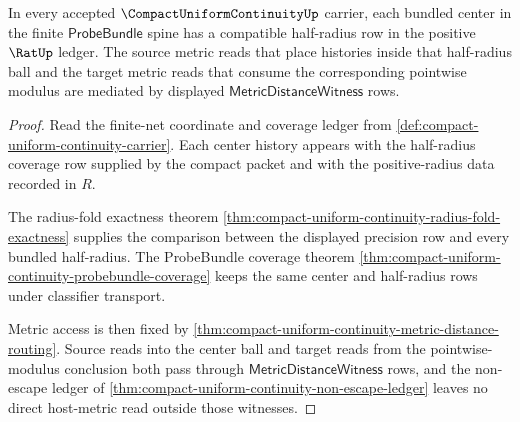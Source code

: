 \begin{theorem}
\label{thm:compact-uniform-continuity-center-radius-compatibility}
In every accepted $\CompactUniformContinuityUp$ carrier, each bundled center in the finite $\mathsf{ProbeBundle}$ spine has a compatible half-radius row in the positive $\RatUp$ ledger. The source metric reads that place histories inside that half-radius ball and the target metric reads that consume the corresponding pointwise modulus are mediated by displayed $\mathsf{MetricDistanceWitness}$ rows.
\end{theorem}
\begin{proof}
Read the finite-net coordinate and coverage ledger from \autoref{def:compact-uniform-continuity-carrier}. Each center history appears with the half-radius coverage row supplied by the compact packet and with the positive-radius data recorded in $R$.

The radius-fold exactness theorem \autoref{thm:compact-uniform-continuity-radius-fold-exactness} supplies the comparison between the displayed precision row and every bundled half-radius. The ProbeBundle coverage theorem \autoref{thm:compact-uniform-continuity-probebundle-coverage} keeps the same center and half-radius rows under classifier transport.

Metric access is then fixed by \autoref{thm:compact-uniform-continuity-metric-distance-routing}. Source reads into the center ball and target reads from the pointwise-modulus conclusion both pass through $\mathsf{MetricDistanceWitness}$ rows, and the non-escape ledger of \autoref{thm:compact-uniform-continuity-non-escape-ledger} leaves no direct host-metric read outside those witnesses.
\end{proof}

